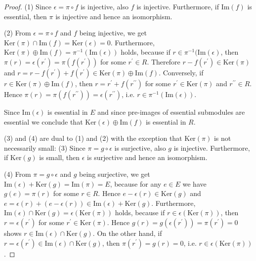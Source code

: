 \documentclass{amsart}
\theoremstyle{plain}
\numberwithin{equation}{section}
\begin{document}
\begin{proof}
(1) Since $\epsilon  =\pi  \circ f$ is injective, also $f$ is injective. Furthermore, if $\mathrm{I} \mathrm{m} (f)$ is essential, then $\pi $ is injective and hence an isomorphism. 

(2) From $\epsilon  =\pi  \circ f$ and $f$ being injective, we get $\mathrm{K} \mathrm{e} \mathrm{r} (\pi ) \cap \mathrm{I} \mathrm{m} (f) =\mathrm{K} \mathrm{e} \mathrm{r} (\epsilon ) =0$. Furthermore, $\mathrm{K} \mathrm{e} \mathrm{r} (\pi ) \oplus \mathrm{I} \mathrm{m} (f) =\pi ^{ -1} (\mathrm{I} \mathrm{m} (\epsilon ))$ holds, because if $r \in \pi ^{ -1}(\mathrm{I} \mathrm{m} (\epsilon )$, then $\pi  (r) =\epsilon  (r^{ \prime }) =\pi  (f (r^{ \prime }))$ for some $r^{ \prime } \in R$. Therefore $r -f (r^{ \prime }) \in \mathrm{K} \mathrm{e} \mathrm{r} (\pi )$ and $r =r -f (r^{ \prime }) +f (r^{ \prime }) \in \mathrm{K} \mathrm{e} \mathrm{r} (\pi ) \oplus \mathrm{I} \mathrm{m} (f)$. Conversely, if $r \in \mathrm{K} \mathrm{e} \mathrm{r} (\pi ) \oplus \mathrm{I} \mathrm{m} (f)$, then $r =r^{ \prime } +f (r^{ \prime  \prime })$ for some $r^{ \prime } \in \mathrm{K} \mathrm{e} \mathrm{r} (\pi )$ and $r^{ \prime  \prime } \in R$. Hence $\pi  (r) =\pi  (f (r^{ \prime  \prime })) =\epsilon  (r^{ \prime  \prime })$, i.e. $r \in \pi ^{ -1} \left (\mathrm{I} \mathrm{m} (\epsilon )\right )$. 

Since $\mathrm{I} \mathrm{m} (\epsilon )$ is essential in $E$ and since pre-images of essential submodules are essential we conclude that $\mathrm{K} \mathrm{e} \mathrm{r} (\epsilon ) \oplus \mathrm{I} \mathrm{m} (f)$ is essential in $R$. 

(3) and (4) are dual to (1) and (2) with the exception that $\mathrm{K} \mathrm{e} \mathrm{r} (\pi )$ is not necessarily small: (3) Since $\pi  =g \circ \epsilon $ is surjective, also $g$ is injective. Furthermore, if $\mathrm{K} \mathrm{e} \mathrm{r} (g)$ is small, then $\epsilon $ is surjective and hence an isomorphism. 

(4) From $\pi  =g \circ \epsilon $ and $g$ being surjective, we get $\mathrm{I} \mathrm{m} (\epsilon ) +\mathrm{K} \mathrm{e} \mathrm{r} (g) =\mathrm{I} \mathrm{m} (\pi ) =E$, because for any $e \in E$ we have $g (e) =\pi  (r)$ for some $r \in R$. Hence $e -\epsilon  (r) \in \mathrm{K} \mathrm{e} \mathrm{r} (g)$ and $e =\epsilon  (r) +(e -\epsilon  (r)) \in \mathrm{I} \mathrm{m} (\epsilon ) +\mathrm{K} \mathrm{e} \mathrm{r} (g)$. Furthermore, $\mathrm{I} \mathrm{m} (\epsilon ) \cap \mathrm{K} \mathrm{e} \mathrm{r} (g) =\epsilon  (\mathrm{K} \mathrm{e} \mathrm{r} (\pi ))$ holds, because if $r \in \epsilon  (\mathrm{K} \mathrm{e} \mathrm{r} (\pi ))$, then $r =\epsilon  (r^{ \prime })$ for some $r^{ \prime } \in \mathrm{K} \mathrm{e} \mathrm{r} (\pi )$. Hence $g (r) =g (\epsilon  (r^{ \prime })) =\pi  (r^{ \prime }) =0$ shows $r \in \mathrm{I} \mathrm{m} (\epsilon ) \cap \mathrm{K} \mathrm{e} \mathrm{r} (g)$. On the other hand, if $r =\epsilon  (r^{ \prime }) \in \mathrm{I} \mathrm{m} (\epsilon ) \cap \mathrm{K} \mathrm{e} \mathrm{r} (g)$, then $\pi  (r^{ \prime }) =g (r) =0$, i.e. $r \in \epsilon  (\mathrm{K} \mathrm{e} \mathrm{r} (\pi ))$. 


\end{proof}
\end{document}
